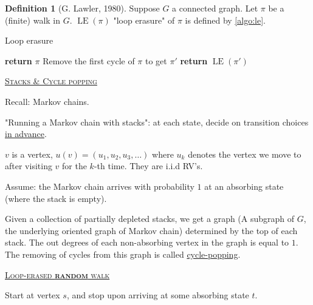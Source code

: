 \documentclass{report}
\def \LE {\operatorname{LE}}
\newcommand{\defeq}{\vcentcolon=}
\newcommand{\fancyem}[1]{\underline{\textsc{#1}}}
\theoremstyle{definition}
\newtheorem{definition}{Definition}[section]
\theoremstyle{remark}
\numberwithin{equation}{section}
\begin{document}
\begin{definition}[G. Lawler, 1980]
    Suppose $G$ a connected graph. Let $\pi$ be a (finite) walk in $G$. $\operatorname{LE}(\pi)$ "loop erasure" of $\pi$ is defined by \autoref{algo:le}.

    \begin{algorithm}[h]
        \caption{Loop erasure}
        \label{algo:le}
        \begin{algorithmic}[1] 
                \State \textbf{return} $\pi$
                \Else 
                    \State Remove the first cycle of $\pi$ to get $\pi'$
                    \State \textbf{return} $\LE(\pi')$
                \EndIf
            \EndProcedure
        \end{algorithmic}
    \end{algorithm}

\end{definition}

\fancyem{Stacks \& Cycle popping}

Recall: Markov chains.

"Running a Markov chain with stacks": at each state, decide on transition choices \underline{in advance}.

$v$ is a vertex, $u(v) = (u_1, u_2, u_3, \ldots)$ where $u_k$ denotes the vertex we move to after visiting $v$ for the $k$-th time. They are i.i.d RV's.

Assume: the Markov chain arrives with probability $1$ at an absorbing state (where the stack is empty).

Given a collection of partially depleted stacks, we get a graph (A subgraph of $G$, the underlying oriented graph of Markov chain) determined by the top of each stack.  The out degrees of each non-absorbing vertex in the graph is equal to $1$. The removing of cycles from this graph is called \underline{cycle-popping}.

\fancyem{Loop-erased \textbf{random} walk}

Start at vertex $s$, and stop upon arriving at some absorbing state $t$. 
\end{document}
